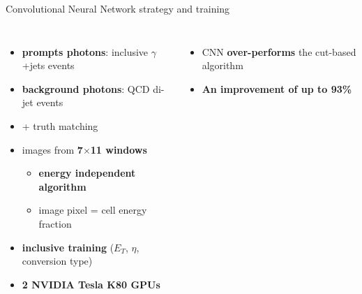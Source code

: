 \begin{frame}{Convolutional Neural Network strategy and training}
\begin{columns}
\begin{itemize}
    \item \textcolor{HHred}{\textbf{prompts photons}}: inclusive $\gamma$+jets events
    \item \textcolor{HHblue}{\textbf{background photons}}: QCD di-jet events 
    \item + truth matching 
    \pause
    \item images from \textbf{7$\times$11 windows} 
    \begin{itemize}
        \item \textbf{energy independent algorithm}
        \item image pixel = cell energy fraction
    \end{itemize}
    \pause
    \item \textbf{inclusive training} ($E_T$, $\eta$, conversion type)
    \item \textbf{2 NVIDIA Tesla K80 GPUs}
    \end{itemize}
    \pause
    \begin{itemize}
        \item CNN \textcolor{HHred}{\textbf{over-performs}} the cut-based algorithm
        \item \textbf{An improvement of up to 93\%}
    \end{itemize}
    
    


\end{columns}
\end{frame}
